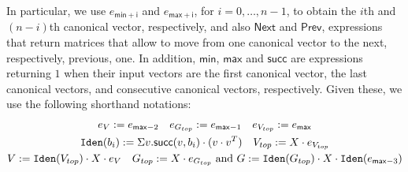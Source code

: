 In particular, we use  $e_{\mathsf{min}+\mathsf{i}}$ and  $e_{\mathsf{max}+\mathsf{i}}$, for $i=0,\ldots,n-1$,
to obtain the $i$th and $(n-i)$th canonical vector, respectively, and also $\mathsf{Next}$ and $\mathsf{Prev}$, expressions that return matrices that allow to
move from one canonical vector to the next, respectively, previous, one. In addition, $\mathsf{min}$, $\mathsf{max}$ and $\mathsf{succ}$ are expressions returning
$1$ when their input vectors are the first canonical vector, the last canonical vectors, and consecutive canonical vectors, respectively. Given these, we use
the following shorthand notations:
\begin{gather*}\allowdisplaybreaks
   e_{V}:=e_{\mathsf{max}-2} \quad e_{G_{top}}:=e_{\mathsf{max}-1} \quad     e_{V_{top}}:=e_{\mathsf{max}} \\
   \Iden{b_i}:=\ssum v. \mathsf{succ}(v,b_i)\cdot (v\cdot v^T)  \quad   V_{top}:= X\cdot e_{V_{top}} \\
        V:= \Iden{V_{top}} \cdot X \cdot e_V \quad
        G_{top} :=X\cdot e_{G_{top}} \text{ and }
        G := \Iden{G_{top}}\cdot X \cdot \Iden{e_{\mathsf{max}-3}}
 \end{gather*}

